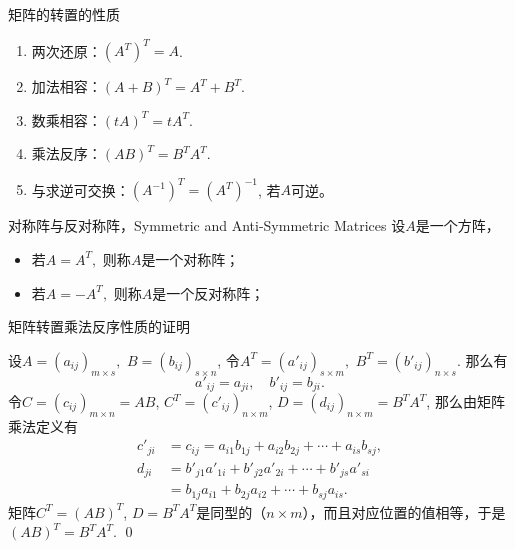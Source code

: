 \begin{frame}{矩阵的转置的性质}

\begin{enumerate}
\item 两次还原：$(A^T)^T = A$.
\item 加法相容：$(A+B)^T = A^T+B^T$.
\item 数乘相容：$(tA)^T = tA^T$.
\item 乘法反序：$(AB)^T = B^TA^T$.
\item 与求逆可交换：$(A^{-1})^T = (A^T)^{-1}$, 若$A$可逆。
\end{enumerate}

\vspace{1em}
\pause

\begin{block}{对称阵与反对称阵，Symmetric and Anti-Symmetric Matrices}
设$A$是一个方阵，
\begin{itemize}
\item 若$A = A^T,$ 则称$A$是一个对称阵；
\item 若$A = -A^T,$ 则称$A$是一个反对称阵；
\end{itemize}
\end{block}

\end{frame}


\begin{frame}{矩阵转置乘法反序性质的证明}

设$A = (a_{ij})_{m\times s},$ $B = (b_{ij})_{s\times n}$, 令$A^T = (a'_{ij})_{s\times m},$ $B^T = (b'_{ij})_{n\times s}$. 那么有
\[a'_{ij} = a_{ji}, \quad b'_{ij} = b_{ji}.\]
令$C = (c_{ij})_{m\times n} = AB$, $C^T = (c'_{ij})_{n\times m}$, $D = (d_{ij})_{n\times m} = B^TA^T$, 那么由矩阵乘法定义有
\begin{align*}
c'_{ji} & = c_{ij} = a_{i1}b_{1j} + a_{i2}b_{2j} + \cdots + a_{is}b_{sj}, \\
d_{ji} & = b'_{j1}a'_{1i} + b'_{j2}a'_{2i} + \cdots + b'_{js}a'_{si} \\
& = b_{1j}a_{i1} + b_{2j}a_{i2} + \cdots + b_{sj}a_{is}.
\end{align*}
矩阵$C^T = (AB)^T$, $D = B^TA^T$是同型的（$n\times m$），而且对应位置的值相等，于是$(AB)^T = B^TA^T$. \qed

\end{frame}

